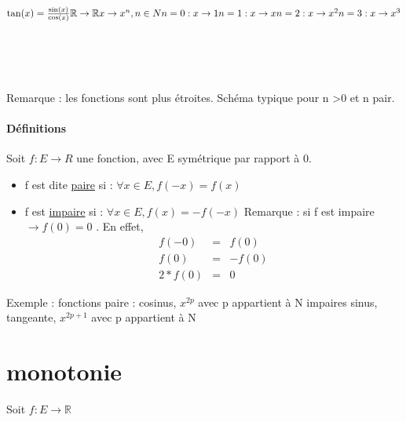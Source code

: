 \begin{math}
\tan(x) = \frac{\sin(x)}{\cos(x)}
\newline
\mathbb{R} \rightarrow \mathbb{R}
x \rightarrow x^n, n \in N
\newline
n = 0 : x \rightarrow 1
\newline
n = 1 :
x \rightarrow x
\newline
n = 2 : 
x \rightarrow x^2
\newline
n = 3 :
x \rightarrow x^3
\end{math}

~\\
~\\
~\\
Remarque : les fonctions sont plus étroites. Schéma typique pour n >0 et n pair.

\paragraph{Définitions} Soit $f:E \rightarrow R$ une fonction, avec E symétrique par rapport à 0.
\begin{itemize}
	\item f est dite \ul{paire} si : $\forall x \in E, f(-x) = f(x)$
	\item f est \ul{impaire} si : $\forall x \in E, f(x) = - f(-x)$ Remarque : si f est impaire $\rightarrow f(0) = 0$ . En effet, 
		\begin{eqnarray}
			f(-0) & = & f(0) \\
			f(0) & = & -f(0) \\
			2*f(0) & = & 0
		\end{eqnarray}
\end{itemize}

Exemple : fonctions paire : cosinus, $x^{2p}$ avec p appartient à N
impaires sinus, tangeante, $x^{2p+1}$ avec p appartient à N

\section{monotonie} Soit $f:E \rightarrow \mathbb{R}$

